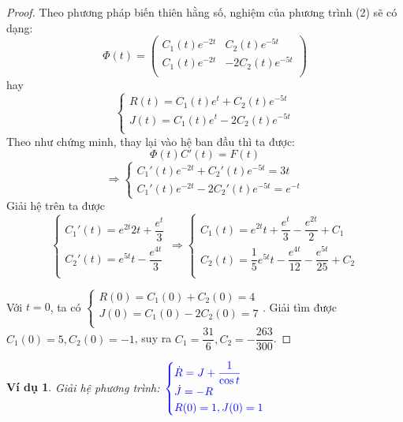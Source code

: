 \documentclass[a4paper]{article}
\newtheorem{example}{Ví dụ}
\begin{document}
\begin{proof}
 Theo phương pháp biến thiên hằng số, nghiệm của phương trình (2) sẽ có dạng:
 $$\Phi(t) = \begin{pmatrix}
     C_1(t) e^{-2t} & C_2(t) e^{-5t} \\
  C_1(t) e^{-2t} & -2C_2(t) e^{-5t} \\    
 \end{pmatrix}$$
 hay
 $$\begin{cases}
     R(t) = C_1(t) e^{t} + C_2(t) e^{-5t} \\
    J(t) = C_1(t) e^{t} - 2C_2(t) e^{-5t} \\    
    \end{cases} $$
    Theo như chứng minh, thay lại vào hệ ban đầu thì ta được: 
    $$\Phi(t)C'(t)=F(t)$$
    $$\Rightarrow \begin{cases}
        C_1'(t)e^{-2t} + C_2'(t) e^{-5t} = 3t\\
        C_1'(t)e^{-2t} - 2C_2'(t)e^{-5t} = e^{-t}
    \end{cases}$$
    Giải hệ trên ta được 
    $$ \begin{cases}
        C_1'(t) = e^{2t}2t+\dfrac{e^{t}}{3}\\
        C_2'(t) = e^{5t}t-\dfrac{e^{4t}}{3} \\ 
    \end{cases}\Rightarrow\begin{cases}
        C_1(t) = e^{2t}t+\dfrac{e^{t}}{3} - \dfrac{e^{2t}}{2} + C_1\\
        C_2(t) = \dfrac{1}{5}e^{5t}t-\dfrac{e^{4t}}{12} - \dfrac{e^{5t}}{25}  + C_2\\ 
    \end{cases}$$

Với $t = 0$, ta có $\begin{cases}
    R(0) = C_1(0) + C_2(0) = 4 \\
    J(0) = C_1(0) - 2C_2(0) = 7 \\
\end{cases}$. Giải tìm được $C_1(0) = 5, C_2(0) = -1$, suy ra $C_1 = \dfrac{31}{6}, C_2 = -\dfrac{263}{300}$.
\end{proof}
\begin{example}
    Giải hệ phương trình: 
   $\textcolor{blue}{
    \begin{cases}
    \dot{R}= J + \dfrac{1}{\cos{t}}\\
    \dot{J}= - R\\
    R(0)=1,J(0)= 1
    \end{cases}
    }$ 
\end{example}
\end{document}

